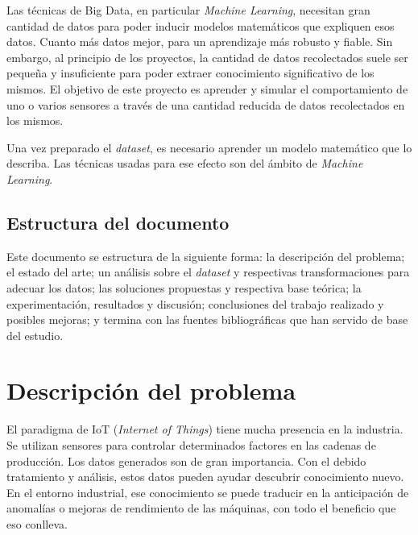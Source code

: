 \documentclass[11pt,spanish,listoffigures,listoftables]{tfgetsinf}
\begin{document}
Las técnicas de Big Data, en particular {\em Machine Learning}, necesitan gran cantidad de datos para poder inducir modelos matemáticos que expliquen esos datos. Cuanto más datos mejor, para un aprendizaje más robusto y fiable. Sin embargo, al principio de los proyectos, la cantidad de datos recolectados suele ser pequeña y insuficiente para poder extraer conocimiento significativo de los mismos. El objetivo de este proyecto es aprender y simular el comportamiento de uno o varios sensores a través de una cantidad reducida de datos recolectados en los mismos. 

Una vez preparado el {\em dataset}, es necesario aprender un modelo matemático que lo describa. Las técnicas usadas para ese efecto son del ámbito de {\em Machine Learning}. 

    
    \section{Estructura del documento}
    
    Este documento se estructura de la siguiente forma: la descripción del problema; el estado del arte; un análisis sobre el {\em dataset} y respectivas transformaciones para adecuar los datos; las soluciones propuestas y respectiva base teórica; la experimentación, resultados y discusión; conclusiones del trabajo realizado y posibles mejoras; y termina con las fuentes bibliográficas que han servido de base del estudio.

\chapter{Descripción del problema}
El paradigma de IoT ({\em Internet of Things}) tiene mucha presencia en la industria. Se utilizan sensores para controlar determinados factores en las cadenas de producción. Los datos generados son de gran importancia. Con el debido tratamiento y análisis, estos datos pueden ayudar descubrir conocimiento nuevo. En el entorno industrial, ese conocimiento se puede traducir en la anticipación de anomalías o mejoras de rendimiento de las máquinas, con todo el beneficio que eso conlleva.
\end{document}

